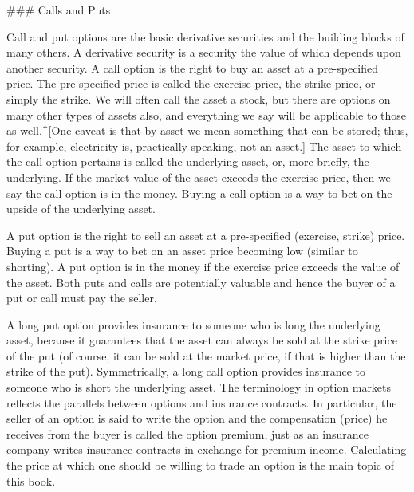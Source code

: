 ### Calls and Puts

Call and put options are the basic derivative securities and the building blocks of many others.  A derivative security is a security the value of which depends upon another security. 
A call option  is the right to buy an asset at a pre-specified price.  The pre-specified price is called the exercise price, the strike price, or simply the strike.    We will often call the asset a stock, but there are options on many other types of assets also, and everything we say will be applicable to those as well.^[One caveat is that by asset we mean something that can be stored; thus, for example, electricity is, practically speaking, not an asset.]  The asset to which the call option pertains is called the underlying asset,  or, more briefly, the underlying.  If the market value of the asset exceeds the exercise price, then we say the call option is in the money.  Buying a call option is a way to bet on the upside of the underlying asset.  

A put option  is the right to sell an asset at a pre-specified (exercise, strike) price.  Buying a put is a way to bet on an asset price becoming low (similar to shorting).  A put option is in the money if the exercise price exceeds the value of the asset.  Both puts and calls are potentially valuable and hence the buyer of a put or call must pay the seller.  

A long put option provides insurance to someone who is long the underlying asset, because it guarantees that the asset can always be sold at the strike price of the put (of course, it can be sold at the market price, if that is higher than the strike of the put).  Symmetrically, a long call option provides insurance to someone who is short the underlying asset. The terminology in option markets reflects the parallels between options and insurance contracts.  In particular, the seller of an option is said to write the option and the compensation (price) he receives from the buyer is called the option premium,  just as an insurance company writes insurance contracts in exchange for premium income.  Calculating the price at which one should be willing to trade an option is the main topic of this book.

